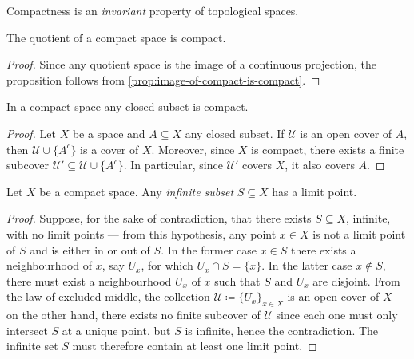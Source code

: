 \begin{corollary}
\label{cor:compactness-topological-invariant}
Compactness is an \emph{invariant} property of topological spaces.
\end{corollary}

\begin{corollary}
\label{cor:quotient-of-compact-space-is-compact}
The quotient of a compact space is compact.
\end{corollary}

\begin{proof}
Since any quotient space is the image of a continuous projection, the
proposition follows from \cref{prop:image-of-compact-is-compact}.
\end{proof}

\begin{proposition}
\label{prop:closed-subset-compact}
In a compact space any closed subset is compact.
\end{proposition}

\begin{proof}
Let \(X\) be a space and \(A \subseteq X\) any closed subset. If \(\mathcal{U}\)
is an open cover of \(A\), then \(\mathcal{U} \cup \{A^c\}\) is a cover of
\(X\). Moreover, since \(X\) is compact, there exists a finite subcover
\(\mathcal{U}' \subseteq \mathcal{U} \cup \{A^c\}\). In particular, since
\(\mathcal{U}'\) covers \(X\), it also covers \(A\).
\end{proof}

\begin{theorem}
\label{thm:bolzano-weierstrass}
Let \(X\) be a compact space. Any \emph{infinite subset} \(S \subseteq X\) has a
limit point.
\end{theorem}

\begin{proof}
Suppose, for the sake of contradiction, that there exists \(S \subseteq X\),
infinite, with no limit points --- from this hypothesis, any point \(x \in X\)
is not a limit point of \(S\) and is either in or out of \(S\). In the former
case \(x \in S\) there exists a neighbourhood of \(x\), say \(U_x\), for which
\(U_x \cap S = \{x\}\). In the latter case \(x \notin S\), there must exist a
neighbourhood \(U_x\) of \(x\) such that \(S\) and \(U_x\) are disjoint. From
the law of excluded middle, the collection
\(\mathcal{U} \coloneq \{U_x\}_{x \in X}\) is an open cover of \(X\) --- on the
other hand, there exists no finite subcover of \(\mathcal{U}\) since each one
must only intersect \(S\) at a unique point, but \(S\) is infinite, hence the
contradiction. The infinite set \(S\) must therefore contain at least one limit
point.
\end{proof}

